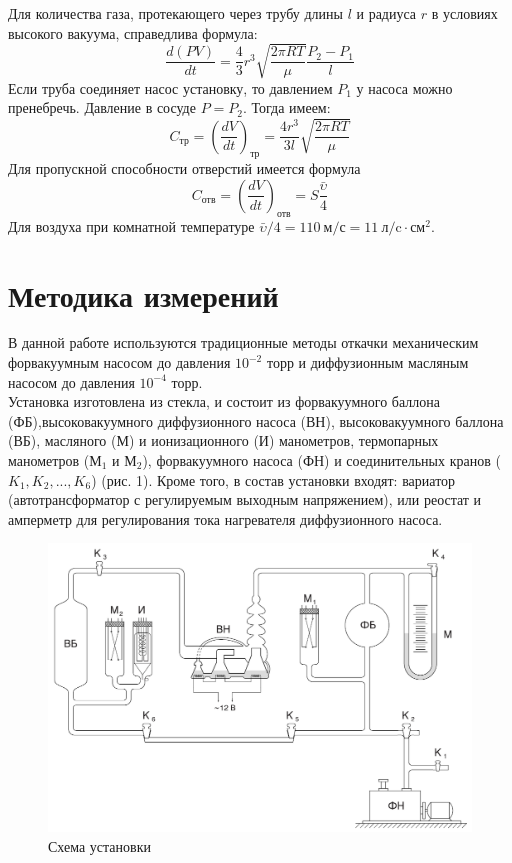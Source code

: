 \documentclass[a4paper, 12pt]{article}
\begin{document}
Для количества газа, протекающего через трубу длины $l$ и радиуса $r$ в условиях высокого вакуума, справедлива формула:
\begin{equation}\label{5}
	\frac{d(PV)}{dt} = \frac{4}{3}r^3\sqrt{\frac{2\pi RT}{\mu}}\frac{P_2 - P_1}{l}
\end{equation}
Если труба соединяет насос установку, то давлением $P_1$ у насоса можно пренебречь. Давление в сосуде $P = P_2$. Тогда имеем:
\begin{equation}\label{6}
C_\text{тр} = \left(\frac{dV}{dt}\right)_\text{тр} = \frac{4r^3}{3l}\sqrt{\frac{2\pi RT}{\mu}}
\end{equation}
Для пропускной способности отверстий имеется формула
\begin{equation}\label{7}
C_\text{отв} = \left(\frac{dV}{dt}\right)_\text{отв} = S\frac{\bar{\upsilon}}{4}
\end{equation}
Для воздуха при комнатной температуре $\bar{\upsilon}/4 = 110~\text{м/с} = 11~\text{л/c}\cdot\text{см}^2$.

\section{Методика измерений}

В данной работе используются традиционные методы откачки механическим форвакуумным насосом до давления $10^{-2}$ торр и диффузионным масляным насосом до давления $10^{-4}$ торр. \\

Установка изготовлена из стекла, и состоит из форвакуумного баллона (ФБ),высоковакуумного диффузионного насоса (ВН), высоковакуумного баллона (ВБ), масляного (М) и ионизационного (И) манометров, термопарных манометров ($\text{М}_1$ и $\text{М}_2$), форвакуумного насоса (ФН) и соединительных кранов ($K_1, K_2,..., K_6$) (рис. 1). Кроме того, в состав установки входят: вариатор
 (автотрансформатор с регулируемым выходным напряжением), или
 реостат и амперметр для регулирования тока нагревателя диффузионного насоса. \\
 
  \begin{figure}[!h]
 	\centering
 	\includegraphics[width=0.5\linewidth]{3.png}
 	\caption[]{Схема установки}
 	\label{fig:Схема установки}
 \end{figure}
 
\end{document}

